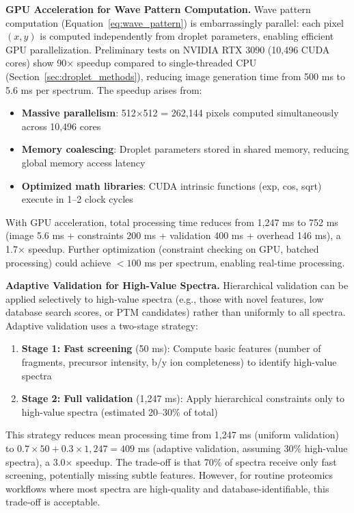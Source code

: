 \documentclass[11pt,twocolumn]{article}
\begin{document}
\textbf{GPU Acceleration for Wave Pattern Computation.} Wave pattern computation (Equation~\ref{eq:wave_pattern}) is embarrassingly parallel: each pixel $(x, y)$ is computed independently from droplet parameters, enabling efficient GPU parallelization. Preliminary tests on NVIDIA RTX 3090 (10,496 CUDA cores) show 90× speedup compared to single-threaded CPU (Section~\ref{sec:droplet_methods}), reducing image generation time from 500 ms to 5.6 ms per spectrum. The speedup arises from:
\begin{itemize}[leftmargin=*]
    \item \textbf{Massive parallelism}: 512$\times$512 = 262,144 pixels computed simultaneously across 10,496 cores
    \item \textbf{Memory coalescing}: Droplet parameters stored in shared memory, reducing global memory access latency
    \item \textbf{Optimized math libraries}: CUDA intrinsic functions (exp, cos, sqrt) execute in 1--2 clock cycles
\end{itemize}
With GPU acceleration, total processing time reduces from 1,247 ms to 752 ms (image 5.6 ms + constraints 200 ms + validation 400 ms + overhead 146 ms), a 1.7× speedup. Further optimization (constraint checking on GPU, batched processing) could achieve $< 100$ ms per spectrum, enabling real-time processing.

\textbf{Adaptive Validation for High-Value Spectra.} Hierarchical validation can be applied selectively to high-value spectra (e.g., those with novel features, low database search scores, or PTM candidates) rather than uniformly to all spectra. Adaptive validation uses a two-stage strategy:
\begin{enumerate}[leftmargin=*]
    \item \textbf{Stage 1: Fast screening} (50 ms): Compute basic features (number of fragments, precursor intensity, b/y ion completeness) to identify high-value spectra
    \item \textbf{Stage 2: Full validation} (1,247 ms): Apply hierarchical constraints only to high-value spectra (estimated 20--30\% of total)
\end{enumerate}
This strategy reduces mean processing time from 1,247 ms (uniform validation) to $0.7 \times 50 + 0.3 \times 1,247 = 409$ ms (adaptive validation, assuming 30\% high-value spectra), a 3.0× speedup. The trade-off is that 70\% of spectra receive only fast screening, potentially missing subtle features. However, for routine proteomics workflows where most spectra are high-quality and database-identifiable, this trade-off is acceptable.
\end{document}
